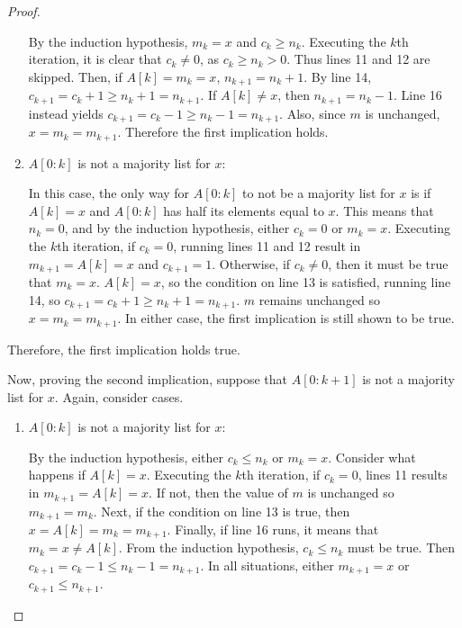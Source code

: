 \documentclass[11pt]{article}
\begin{document}
\begin{proof}
\begin{enumerate}
            By the induction hypothesis, \(m_k = x\) and \(c_k \geq n_k\). Executing the \(k\)th iteration, it is clear that \(c_k \neq 0\), as \(c_k \geq n_k > 0\). Thus lines 11 and 12 are skipped. Then, if \(A[k]=m_k = x\), \(n_{k+1} = n_k + 1\). By line 14, \(c_{k+1} = c_k + 1 \geq n_k + 1 = n_{k+1}\). If \(A[k]\neq x\), then \(n_{k+1} = n_k - 1\). Line 16 instead yields \(c_{k+1} = c_k - 1 \geq n_k - 1 = n_{k+1}\).  Also, since \(m\) is unchanged, \(x=m_k=m_{k+1}\). Therefore the first implication holds.

            \item \(A[0:k]\) is not a majority list for \(x\):
            
            In this case, the only way for \(A[0:k]\) to not be a majority list for \(x\) is if \(A[k]=x\) and \(A[0:k]\) has half its elements equal to \(x\). This means that \(n_k=0\), and by the induction hypothesis, either \(c_k = 0\) or \(m_k=x\). Executing the \(k\)th iteration, if \(c_k=0\), running lines 11 and 12 result in \(m_{k+1} = A[k] = x\) and \(c_{k+1} = 1\). Otherwise, if \(c_k \neq 0\), then it must be true that \(m_k=x\). \(A[k]=x\), so the condition on line 13 is satisfied, running line 14, so \(c_{k+1} = c_k + 1 \geq n_k + 1 = n_{k+1}\). \(m\) remains unchanged so \(x=m_k=m_{k+1}\). In either case, the first implication is still shown to be true.
        \end{enumerate}
        Therefore, the first implication holds true.

        Now, proving the second implication, suppose that \(A[0:k+1]\) is not a majority list for \(x\). Again, consider cases.
        \begin{enumerate}
            \item \(A[0:k]\) is not a majority list for \(x\):
            
            By the induction hypothesis, either \(c_k \leq n_k\) or \(m_k = x\). Consider what happens if \(A[k]= x\). Executing the \(k\)th iteration, if \(c_k=0\), lines 11 results in \(m_{k+1} = A[k]= x\). If not, then the value of \(m\) is unchanged so \(m_{k+1} = m_k\). Next, if the condition on line 13 is true, then \(x = A[k]= m_k= m_{k+1}\). Finally, if line 16 runs, it means that \(m_k = x \neq A[k]\). From the induction hypothesis, \(c_k \leq n_k\) must be true. Then \(c_{k+1} = c_k - 1 \leq n_k - 1 = n_{k+1}\). In all situations, either \(m_{k+1} = x\) or \(c_{k+1} \leq n_{k+1}\).


\end{enumerate}
\end{proof}
\end{document}
